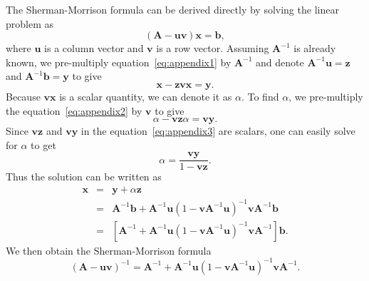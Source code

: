 The Sherman-Morrison formula can be derived directly
by solving the linear problem as
 \begin{equation}
  \label{eq:appendix1}
(\mathbf{A}-\mathbf{u}\mathbf{v})\mathbf{x}=\mathbf{b},
\end{equation}
where $\mathbf{u}$ is a column vector and $\mathbf{v}$ is a row
vector. Assuming $\mathbf{A}^{-1}$ is already
known, we pre-multiply equation~\ref{eq:appendix1} by
$\mathbf{A}^{-1}$ and denote $\mathbf{A}^{-1}\mathbf{u}=\mathbf{z}$
and $\mathbf{A}^{-1}\mathbf{b}=\mathbf{y}$ to give
\begin{equation}
\label{eq:appendix2}
\mathbf{x}-\mathbf{z}\mathbf{v}\mathbf{x}=\mathbf{y}.
\end{equation}
Because $\mathbf{v}\mathbf{x}$ is a scalar quantity, we can denote
it as $\alpha$. To find $\alpha$, we pre-multiply the
equation~\ref{eq:appendix2} by $\mathbf{v}$ to give
\begin{equation}
\label{eq:appendix3}
\alpha-\mathbf{v}\mathbf{z}\alpha=\mathbf{v}\mathbf{y}.
\end{equation}
Since $\mathbf{v}\mathbf{z}$ and $\mathbf{v}\mathbf{y}$ in the
equation~\ref{eq:appendix3} are scalars, one can easily solve for $\alpha$
to get
\begin{equation}
\label{eq:appendix4}
\alpha=\frac{\mathbf{v}\mathbf{y}}{1-\mathbf{v}\mathbf{z}}.
\end{equation}
Thus the solution can be written as
\begin{eqnarray}
\label{eq:appendix5}
\mathbf{x}&=&\mathbf{y}+\alpha\mathbf{z} \\
          &=&\mathbf{A}^{-1}\mathbf{b}+\mathbf{A}^{-1}\mathbf{u}
              (1-\mathbf{v}\mathbf{A}^{-1}\mathbf{u})^{-1}
               \mathbf{v}\mathbf{A}^{-1}\mathbf{b} \\
          &=&[\mathbf{A}^{-1}+\mathbf{A}^{-1}\mathbf{u}
              (1-\mathbf{v}\mathbf{A}^{-1}\mathbf{u})^{-1}
               \mathbf{v}\mathbf{A}^{-1}]\mathbf{b}.
\end{eqnarray}
We then obtain the Sherman-Morrison formula
\begin{equation}
  \label{eq:appendix6}
(\mathbf{A}-\mathbf{u}\mathbf{v})^{-1}=\mathbf{A}^{-1}+
\mathbf{A}^{-1}\mathbf{u}(1-
\mathbf{v}\mathbf{A}^{-1}\mathbf{u})^{-1}\mathbf{v}\mathbf{A}^{-1}.
\end{equation}




